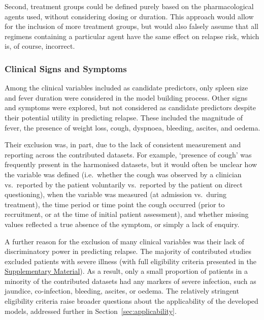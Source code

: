 Second, treatment groups could be defined purely based on the pharmacological agents used, without considering dosing or duration. This approach would allow for the inclusion of more treatment groups, but would also falsely assume that all regimens containing a particular agent have the same effect on relapse risk, which is, of course, incorrect.

\subsubsection{Clinical Signs and Symptoms}

Among the clinical variables included as candidate predictors, only spleen size and fever duration were considered in the model building process. Other signs and symptoms were explored, but not considered as candidate predictors despite their potential utility in predicting relapse. These included the magnitude of fever, the presence of weight loss, cough, dyspnoea, bleeding, ascites, and oedema.

Their exclusion was, in part, due to the lack of consistent measurement and reporting across the contributed datasets. For example, `presence of cough' was frequently present in the harmonised datasets, but it would often be unclear how the variable was defined (i.e.\ whether the cough was observed by a clinician vs.\ reported by the patient voluntarily vs.\ reported by the patient on direct questioning), when the variable was measured (at admission vs.\ during treatment), the time period or time point the cough occurred (prior to recruitment, or at the time of initial patient assessment), and whether missing values reflected a true absence of the symptom, or simply a lack of enquiry.

A further reason for the exclusion of many clinical variables was their lack of discriminatory power in predicting relapse. The majority of contributed studies excluded patients with severe illness (with full eligibility criteria presented in the \href{https://github.com/jpwil/dphil}{Supplementary Material}). As a result, only a small proportion of patients in a minority of the contributed datasets had any markers of severe infection, such as jaundice, co-infection, bleeding, ascites, or oedema. The relatively stringent eligibility criteria raise broader questions about the applicability of the developed models, addressed further in Section~\ref{sec:applicability}.

